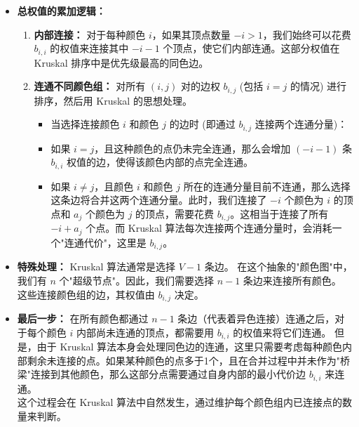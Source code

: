 \documentclass[11pt]{beamer}
\begin{document}
\begin{frame}
    \begin{itemize}
        \item \textbf{总权值的累加逻辑：}
        \begin{enumerate}
            \item \textbf{内部连接：} 对于每种颜色 $i$，如果其顶点数量 $-i > 1$，我们始终可以花费 $b_{i,i}$ 的权值来连接其中 $-i - 1$ 个顶点，使它们内部连通。这部分权值在 Kruskal 排序中是优先级最高的同色边。
            \item \textbf{连通不同颜色组：} 对所有 $(i, j)$ 对的边权 $b_{i,j}$ (包括 $i=j$ 的情况) 进行排序，然后用 Kruskal 的思想处理。
            \begin{itemize}
                \item 当选择连接颜色 $i$ 和颜色 $j$ 的边时 (即通过 $b_{i,j}$ 连接两个连通分量)：
                \item 如果 $i=j$，且这种颜色的点仍未完全连通，那么会增加 $(-i - 1)$ 条 $b_{i,i}$ 权值的边，使得该颜色内部的点完全连通。
                \item 如果 $i \ne j$，且颜色 $i$ 和颜色 $j$ 所在的连通分量目前不连通，那么选择这条边将合并这两个连通分量。此时，我们连接了 $-i$ 个颜色为 $i$ 的顶点和 $a_j$ 个颜色为 $j$ 的顶点，需要花费 $b_{i,j}$。这相当于连接了所有 $-i + a_j$ 个点。而 Kruskal 算法每次连接两个连通分量时，会消耗一个"连通代价"，这里是 $b_{i,j}$。
            \end{itemize}
        \end{enumerate}
    \end{itemize}
\end{frame}

\begin{frame}
    \begin{itemize}
        \item \textbf{特殊处理：} Kruskal 算法通常是选择 $V-1$ 条边。
        在这个抽象的"颜色图"中，我们有 $n$ 个"超级节点"。因此，我们需要选择 $n-1$ 条边来连接所有颜色。\\
        这些连接颜色组的边，其权值由 $b_{i,j}$ 决定。
    \end{itemize}
\end{frame}

\begin{frame}
    \begin{itemize}
        \item \textbf{最后一步：} 在所有颜色都通过 $n-1$ 条边（代表着异色连接）连通之后，对于每个颜色 $i$ 内部尚未连通的顶点，都需要用 $b_{i,i}$ 的权值来将它们连通。
        但是，由于 Kruskal 算法本身会处理同色边的连通，这里只需要考虑每种颜色内部剩余未连接的点。如果某种颜色的点多于1个，且在合并过程中并未作为"桥梁"连接到其他颜色，那么这部分点需要通过自身内部的最小代价边 $b_{i,i}$ 来连通。\\
        这个过程会在 Kruskal 算法中自然发生，通过维护每个颜色组内已连接点的数量来判断。
    \end{itemize}
\end{frame}
\end{document}
